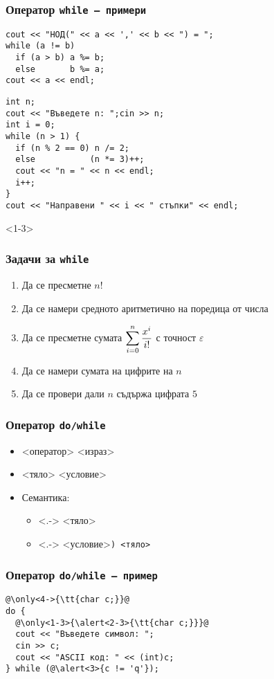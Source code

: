 \documentclass{beamer}
\newcommand{\expsum}{\displaystyle \sum_{i=0}^n \limits \frac{x^i}{i!}}
\begin{document}
\begin{frame}[fragile]
  \frametitle{Оператор \tt{while} --- примери}

\begin{lstlisting}
cout << "НОД(" << a << ',' << b << ") = ";
while (a != b)
  if (a > b) a %= b;
  else       b %= a;
cout << a << endl;
\end{lstlisting}
\pause
\begin{lstlisting}
int n;
cout << "Въведете n: ";cin >> n;
int i = 0;
while (n > 1) {
  if (n % 2 == 0) n /= 2;
  else           (n *= 3)++;
  cout << "n = " << n << endl;
  i++;
}
cout << "Направени " << i << " стъпки" << endl;
\end{lstlisting}
\end{frame}

\begin{frame}<1-3>
  \frametitle{Задачи за \tt{while}}

  \begin{enumerate}[<+->]
  \item Да се пресметне $n!$
  \item Да се намери средното аритметично на поредица от числа
  \item Да се пресметне сумата $\expsum$ с точност $\varepsilon$
  \item Да се намери сумата на цифрите на $n$
  \item Да се провери дали $n$ съдържа цифрата $5$
  \end{enumerate}
\end{frame}

\begin{frame}
  \frametitle{Оператор \tt{do/while}}

  \begin{itemize}[<+->]
  \item {} <оператор> <израз>\tta{);}
  \item {} <тяло> <условие>\tta{);}
  \item Семантика:
    \begin{itemize}
    \item<.-> <тяло>
    \item<.-> <условие>\tt) <тяло>
    \end{itemize}
  \end{itemize}
\end{frame}

\begin{frame}
  \frametitle{Оператор \tt{do/while} --- пример}

\begin{lstlisting}
@\only<4->{\tt{char c;}}@
do {
  @\only<1-3>{\alert<2-3>{\tt{char c;}}}@
  cout << "Въведете символ: ";
  cin >> c;
  cout << "ASCII код: " << (int)c;
} while (@\alert<3>{c != 'q'});
\end{lstlisting}
\end{frame}
\end{document}
